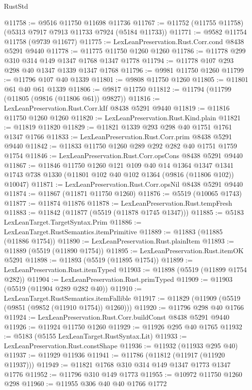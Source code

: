\begin{lexlean}{RustStd}
\begin{coremodule}
@11758 := @9516 @11750 @11698 @11736
@11767 := @11752 (@11755 @11758) (@5313 @7917 @7913 @11733 @7924 (@5184 @11733))
@11771 := @9582 @11754 @11758 (@9739 @11677)
@11775 := LexLeanPreservation.Rust.Corr.cond @8438 @5291 @9440
@11778 := @11775 @11750 @1260 @1260
@11786 := @11778 @299 @310 @314 @149 @1347 @1768 @1347 @1778
@11794 := @11778 @107 @293 @298 @40 @1347 @1339 @1347 @1768
@11796 := @9981 @11750 @1260
@11799 := @11796 @107 @40 @1339
@11801 := @9808 @11750 @1260
@11805 := @11801 @61 @40 @61 @1339
@11806 := @9817 @11750
@11812 := @11794 (@11799 (@11805 (@9816 (@11806 @61)) @9827))
@11816 := LexLeanPreservation.Rust.Corr.kIf @8438 @5291 @9440
@11819 := @11816 @11750 @1260 @1260
@11820 := LexLeanPreservation.Rust.Kind.plain
@11821 := @11819 @11820
@11829 := @11821 @1339 @293 @298 @40 @1751 @1761 @1347 @1766
@11833 := LexLeanPreservation.Rust.Corr.prim @8438 @5291 @9440
@11842 := @11833 @11750 @1260 @289 @292 @282 @40 @1751 @1759 @1754
@11846 := LexLeanPreservation.Rust.Corr.opsCons @8438 @5291 @9440
@11867 := @11846
    @11750
    @1260
    @121
    @109
    @40
    @14
    @1364
    @1347
    @1341
    @1743
    @738
    @1330
    (@11801 @102 @40 @102 @1364 (@9816 (@11806 @102)) @10047)
@11871 := LexLeanPreservation.Rust.Corr.opsNil @8438 @5291 @9440
@11874 := @11867 (@11871 @11750 @1260)
@11876 := @5519 (@10065 @1743)
@11877 := @11874 @11876
@11878 := LexLeanPreservation.Rust.tempFresh
@11883 := @11842 (@11877 (@5519 (@11878 @1745 @1347)))
@11885 := @5183 LexLeanTarget.TargetSyntax.Prim
@11886 := LexLeanTarget.RustSemantics.itemPrimitive
@11889 := @11883 (@11885 (@11886 @1754))
@11890 := LexLeanPreservation.Rust.plainItem
@11893 := @11889 (@5519 (@11890 @1754))
@11895 := LexLeanPreservation.Rust.itemOK @5291
@11898 := @11893 (@5519 (@11895 @1754))
@11899 := LexLeanPreservation.Rust.itemTyped
@11903 := @11898 (@5519 (@11899 @1754 @282))
@11904 := LexLeanPreservation.Rust.primTyped
@11909 := @11903 (@5519 (@11904 @289 @282 @40))
@11910 := LexLeanTarget.RustSemantics.itemFallible
@11917 := @11829 (@11909 (@5519 (@9851 (@9852 (@11910 @1754)) @1260)))
@11920 := @11796 @298 @40 @1766
@11924 := LexLeanPreservation.Rust.Corr.buildConst @8438 @5291 @9440
@11926 := @11924 @11750 @1260
@11929 := @11926 @295 @40 @1765
@11932 := @5183 (@5155 LexLeanTarget.RustSyntax.Lit)
@11933 := LexLeanPreservation.Rust.constShape
@11936 := @11932 (@11933 @295 @40)
@11937 := @11929 @11936
@11941 := @11786 (@11812 (@11917 (@11920 @11937)))
@11949 := @11821 @1768 @310 @314 @149 @1347 @1773 @1347 @1776
@11952 := @11796 @310 @149 @1773
@11955 := @10972 @11750 @1260 @298
@11960 := @11955 @306 @40 @40 @1766 @1772

\end{coremodule}
\end{lexlean}

